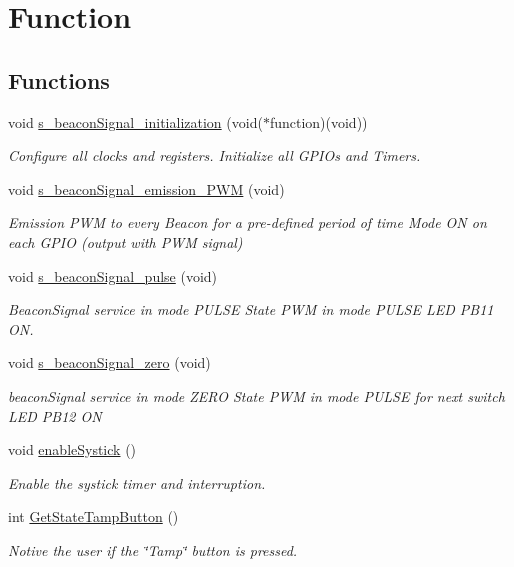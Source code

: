 \hypertarget{group__beacon_signal___function}{\section{Function}
\label{group__beacon_signal___function}
}
\subsection*{Functions}
\begin{DoxyCompactItemize}
\item 
void \hyperlink{group__beacon_signal___function_gacbfa3327cc59cede48c905ac55acebbf}{s\+\_\+beacon\+Signal\+\_\+initialization} (void($\ast$function)(void))
\begin{DoxyCompactList}\small\item\em Configure all clocks and registers. Initialize all G\+P\+I\+Os and Timers. \end{DoxyCompactList}\item 
void \hyperlink{group__beacon_signal___function_ga6bf9d61389109b2910e92147c1d90eb6}{s\+\_\+beacon\+Signal\+\_\+emission\+\_\+\+P\+W\+M} (void)
\begin{DoxyCompactList}\small\item\em Emission P\+W\+M to every Beacon for a pre-\/defined period of time Mode O\+N on each G\+P\+I\+O (output with P\+W\+M signal) \end{DoxyCompactList}\item 
void \hyperlink{group__beacon_signal___function_gae20fd0fba90163454d5267b58a9e14bd}{s\+\_\+beacon\+Signal\+\_\+pulse} (void)
\begin{DoxyCompactList}\small\item\em Beacon\+Signal service in mode P\+U\+L\+S\+E State P\+W\+M in mode P\+U\+L\+S\+E L\+E\+D P\+B11 O\+N. \end{DoxyCompactList}\item 
void \hyperlink{group__beacon_signal___function_gaaf389a27404471cffbdb1599aec96c73}{s\+\_\+beacon\+Signal\+\_\+zero} (void)
\begin{DoxyCompactList}\small\item\em beacon\+Signal service in mode Z\+E\+R\+O State P\+W\+M in mode P\+U\+L\+S\+E for next switch L\+E\+D P\+B12 O\+N \end{DoxyCompactList}\item 
void \hyperlink{group__beacon_signal___function_ga90346dc49f0a8f6eeaaab8a26f3a22b5}{enable\+Systick} ()
\begin{DoxyCompactList}\small\item\em Enable the systick timer and interruption. \end{DoxyCompactList}\item 
int \hyperlink{group__beacon_signal___function_ga0718b0d6218cd14a7c5410925ffbbd83}{Get\+State\+Tamp\+Button} ()
\begin{DoxyCompactList}\small\item\em Notive the user if the \char`\"{}\+Tamp\char`\"{} button is pressed. \end{DoxyCompactList}\end{DoxyCompactItemize}


